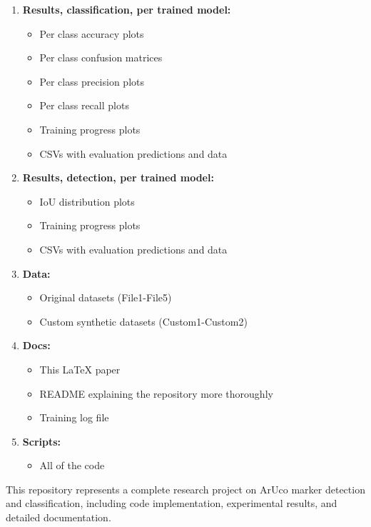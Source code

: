 \documentclass[conference]{IEEEtran}
\begin{document}
\begin{enumerate}
    \item \textbf{Results, classification, per trained model:}
    \begin{itemize}
        \item Per class accuracy plots
        \item Per class confusion matrices
        \item Per class precision plots
        \item Per class recall plots
        \item Training progress plots
        \item CSVs with evaluation predictions and data
    \end{itemize}

    \item \textbf{Results, detection, per trained model:}
    \begin{itemize}
        \item IoU distribution plots
        \item Training progress plots
        \item CSVs with evaluation predictions and data
    \end{itemize}

    \item \textbf{Data:}
    \begin{itemize}
        \item Original datasets (File1-File5)
        \item Custom synthetic datasets (Custom1-Custom2)
    \end{itemize}

    \item \textbf{Docs:}
    \begin{itemize}
        \item This LaTeX paper
        \item README explaining the repository more thoroughly
        \item Training log file
    \end{itemize}

    \item \textbf{Scripts:}
    \begin{itemize}
        \item All of the code
    \end{itemize}
\end{enumerate}

This repository represents a complete research project on ArUco marker detection and classification, including code
implementation, experimental results, and detailed documentation.
\end{document}
